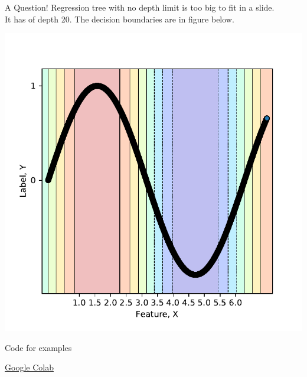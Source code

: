 \documentclass{beamer}
\begin{document}
	\begin{frame}{A Question!}
	Regression tree with no depth limit is too big to fit in a slide. \\
	It has of depth 20. The decision boundaries are in figure below.\\
	\begin{center}
	\includegraphics[scale=0.5]{sine-no-depth-tree}
	\end{center}
	\end{frame}

	\begin{frame}{Code for examples}
	\begin{center}
	\href{https://colab.research.google.com/drive/1NnuVxypYfEOvpMbFHE4075CI-EkT8S7B}{Google Colab}
	\end{center}
	\end{frame}
\end{document}
